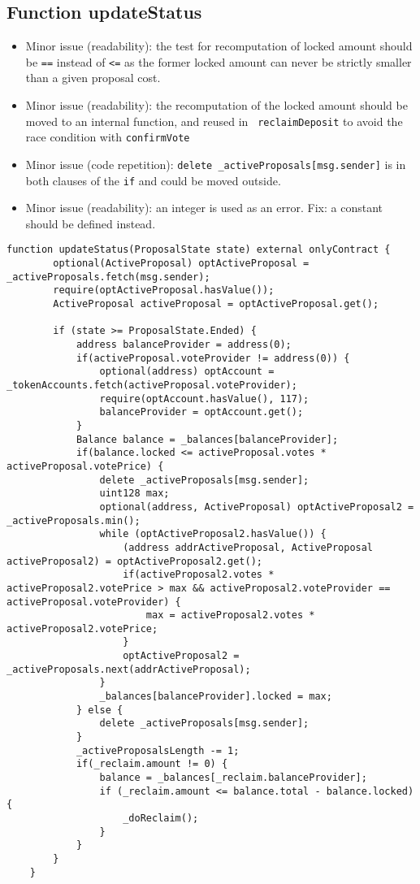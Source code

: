 \subsection{Function updateStatus}

\begin{itemize}
\item Minor issue (readability): the test for recomputation of locked
  amount should be {\tt ==} instead of {\tt <=} as the former
  locked amount can never be strictly smaller than a given proposal
  cost.
\item Minor issue (readability): the recomputation of the locked
  amount should be moved to an internal function, and reused in {\tt
    reclaimDeposit} to avoid the race condition with {\tt confirmVote}
\item Minor issue (code repetition): {\tt delete
  \_activeProposals[msg.sender]} is in both clauses of the {\tt if}
  and could be moved outside.
\item Minor issue (readability): an integer is used as an error. Fix:
  a constant should be defined instead.
\end{itemize}

\begin{lstlisting}[firstnumber=149]
    function updateStatus(ProposalState state) external onlyContract {
        optional(ActiveProposal) optActiveProposal = _activeProposals.fetch(msg.sender);
        require(optActiveProposal.hasValue());
        ActiveProposal activeProposal = optActiveProposal.get();

        if (state >= ProposalState.Ended) {
            address balanceProvider = address(0);
            if(activeProposal.voteProvider != address(0)) {
                optional(address) optAccount = _tokenAccounts.fetch(activeProposal.voteProvider);
                require(optAccount.hasValue(), 117);
                balanceProvider = optAccount.get();
            }
            Balance balance = _balances[balanceProvider];
            if(balance.locked <= activeProposal.votes * activeProposal.votePrice) {
                delete _activeProposals[msg.sender];
                uint128 max;
                optional(address, ActiveProposal) optActiveProposal2 = _activeProposals.min();
                while (optActiveProposal2.hasValue()) {
                    (address addrActiveProposal, ActiveProposal activeProposal2) = optActiveProposal2.get();
                    if(activeProposal2.votes * activeProposal2.votePrice > max && activeProposal2.voteProvider == activeProposal.voteProvider) {
                        max = activeProposal2.votes * activeProposal2.votePrice;
                    }
                    optActiveProposal2 = _activeProposals.next(addrActiveProposal);
                }
                _balances[balanceProvider].locked = max;
            } else {
                delete _activeProposals[msg.sender];
            }
            _activeProposalsLength -= 1;
            if(_reclaim.amount != 0) {
                balance = _balances[_reclaim.balanceProvider];
                if (_reclaim.amount <= balance.total - balance.locked) {
                    _doReclaim();
                }
            }
        }
    }
\end{lstlisting}
